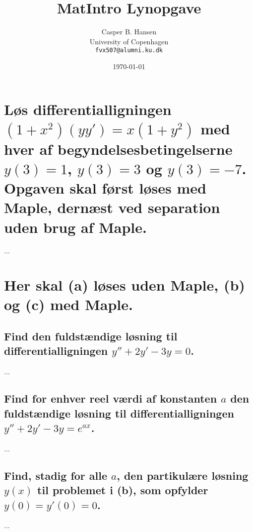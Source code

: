 \documentclass[11pt,a4paper]{article}
\title{MatIntro Lynopgave \assignmentnumber}
\author
{
    Casper B. Hansen\\
    University of Copenhagen\\
    {\tt fvx507@alumni.ku.dk}
}
\date{\today}
\begin{document}


\section
{
    \mdseries
    Løs differentialligningen $(1 + x^2)(yy') = x(1 + y^2)$ med hver af
    begyndelsesbetingelserne $y(3) = 1$, $y(3) = 3$ og $y(3) = -7$. Opgaven
    skal først løses med Maple, dernæst ved separation uden brug af Maple.
}
...

\section
{
    \mdseries
    Her skal (a) løses uden Maple, (b) og (c) med Maple.
}

\subsection
{
    \mdseries
    Find den fuldstændige løsning til differentialligningen $y'' + 2y' -3y =
    0$.
}
...

\subsection
{
    \mdseries
    Find for enhver reel værdi af konstanten $a$ den fuldstændige løsning til
    differentialligningen $y'' + 2y' - 3y = e^{ax}$.
}
...

\subsection
{
    \mdseries
    Find, stadig for alle $a$, den partikulære løsning $y(x)$ til problemet
    i (b), som opfylder $y(0) = y'(0) = 0$.
}
...
\end{document}
